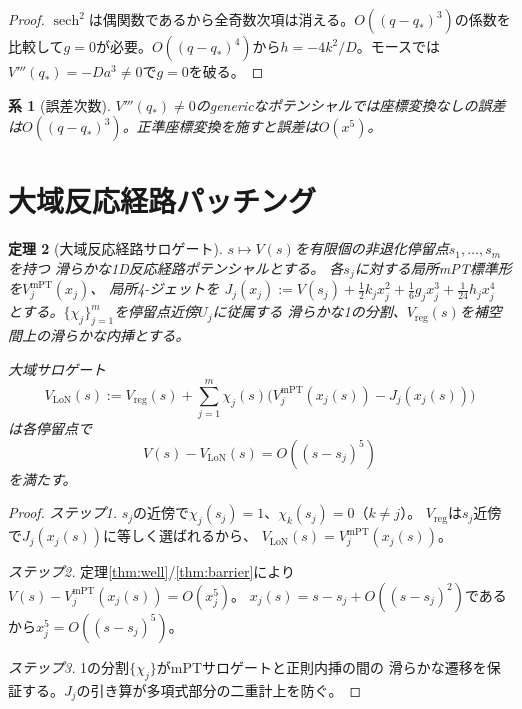 \documentclass[12pt]{article}
\theoremstyle{plain}
\newtheorem{theorem}{定理}[section]
\newtheorem{corollary}[theorem]{系}
\theoremstyle{definition}
\numberwithin{equation}{section}
\newcommand{\LoN}{\mathrm{LoN}}
\DeclareMathOperator{\sech}{sech}
\begin{document}
\begin{proof}
$\sech^2$は偶関数であるから全奇数次項は消える。$O((q-q_*)^3)$の係数を比較して$g=0$が必要。$O((q-q_*)^4)$から$h=-4k^2/D$。モースでは$V'''(q_*)=-Da^3\neq 0$で$g=0$を破る。
\end{proof}

\begin{corollary}[誤差次数]\label{cor:error}
$V'''(q_*)\neq 0$のgenericなポテンシャルでは座標変換なしの誤差は$O((q-q_*)^3)$。正準座標変換を施すと誤差は$O(x^5)$。
\end{corollary}


\section{大域反応経路パッチング}\label{sec:patching}

\begin{theorem}[大域反応経路サロゲート]\label{thm:patching}
$s\mapsto V(s)$を有限個の非退化停留点$s_1,\ldots,s_m$を持つ
滑らかな1D反応経路ポテンシャルとする。
各$s_j$に対する局所mPT標準形を$V_j^{\mathrm{mPT}}(x_j)$、
局所4-ジェットを
$J_j(x_j):=V(s_j)+\frac{1}{2}k_j x_j^2+\frac{1}{6}g_j x_j^3
+\frac{1}{24}h_j x_j^4$
とする。$\{\chi_j\}_{j=1}^m$を停留点近傍$U_j$に従属する
滑らかな1の分割、$V_{\mathrm{reg}}(s)$を補空間上の滑らかな内挿とする。

大域サロゲート
\begin{equation}
\boxed{V_{\LoN}(s) := V_{\mathrm{reg}}(s)
+ \sum_{j=1}^m \chi_j(s)\bigl(
V_j^{\mathrm{mPT}}(x_j(s)) - J_j(x_j(s))\bigr)}
\end{equation}
は各停留点で
\begin{equation}
\boxed{V(s) - V_{\LoN}(s) = O\!\left((s-s_j)^5\right)}
\end{equation}
を満たす。
\end{theorem}

\begin{proof}
\emph{ステップ1.}
$s_j$の近傍で$\chi_j(s_j)=1$、$\chi_k(s_j)=0$（$k\neq j$）。
$V_{\mathrm{reg}}$は$s_j$近傍で$J_j(x_j(s))$に等しく選ばれるから、
$V_{\LoN}(s)=V_j^{\mathrm{mPT}}(x_j(s))$。

\emph{ステップ2.}
定理\ref{thm:well}/\ref{thm:barrier}により
$V(s)-V_j^{\mathrm{mPT}}(x_j(s))=O(x_j^5)$。
$x_j(s)=s-s_j+O((s-s_j)^2)$であるから$x_j^5=O((s-s_j)^5)$。

\emph{ステップ3.}
1の分割$\{\chi_j\}$がmPTサロゲートと正則内挿の間の
滑らかな遷移を保証する。$J_j$の引き算が多項式部分の二重計上を防ぐ。
\end{proof}
\end{document}
